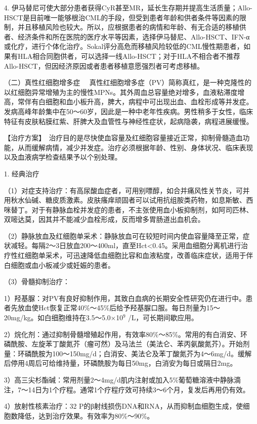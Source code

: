 4.
伊马替尼可使大部分患者获得CyR甚至MR，延长生存期并提高生活质量；Allo-HSCT是目前唯一能够根治CML的手段，但受到患者年龄和供者条件等因素的限制，并且移植风险也较大。所以，应根据患者的病情和年龄、有无合适的移植供者、经济条件和所在医院的医疗水平等因素，选择伊马替尼、Allo-HSCT、IFN-α或化疗，进行个体化治疗。Sokal评分高危而移植风险较低的CML慢性期患者，如果有HLA相合同胞供者，可以选择一线Allo-HSCT；对于HLA不相合者不推荐Allo-HSCT，但因经济原因或者患者移植意愿强烈者可考虑移植。

{（二）真性红细胞增多症}
　真性红细胞增多症（PV）简称真红，是一种克隆性的以红细胞异常增殖为主的慢性MPNs。其外周血总容量绝对增多，血液粘滞度增高，常伴有白细胞和血小板升高，脾大，病程中可出现出血、血栓形成等并发症。发病高峰年龄集中在50～60岁，因此是一种中老年性疾病。男性稍多于女性，临床特征有皮肤粘膜红紫、肝脾大及血管性与神经性症状，起病隐袭，病程进展缓慢。

【治疗方案】　治疗目的是尽快使血容量及红细胞容量接近正常，抑制骨髓造血功能，从而缓解病情，减少并发症。治疗必须根据年龄、性别、身体状况、临床表现以及血液病学检查结果予以个别处理。

1. 经典治疗

（1）对症支持治疗：有高尿酸血症者，可用别嘌醇，如合并痛风性关节炎，可并用秋水仙碱、糖皮质激素。皮肤瘙痒顽固者可以试用抗组胺类药物，如息斯敏、西咪替丁。对于有静脉血栓并发症的患者，不主张使用血小板抑制剂，如阿司匹林、双嘧达莫，因其并不能减少血栓形成，反而增多胃肠道出血机会。

（2）静脉放血及红细胞单采术：静脉放血可在较短时间内使血容量降至正常，症状减轻。每隔2～3日放血200～400ml，直至Hct<0.45。采用血细胞分离机进行治疗性红细胞单采术，可迅速降低血细胞比容和血液粘度，改善临床症状，适用于伴白细胞或血小板减少或妊娠的患者。

（3）骨髓抑制治疗：

1）羟基脲：对PV有良好抑制作用，其致白血病的长期安全性研究仍在进行中。患者先放血使Hct恢复正常40\%～45\%后给予羟基脲口服。每日剂量为15～20mg/kg。如白细胞维持在3.5～5.0×10$^{9}$
/L，可长期间歇应用。

2）烷化剂：通过抑制骨髓增殖起作用，有效率80\%～85\%。常用的有白消安、环磷酰胺、左旋苯丁酸氮芥（瘤可然）及马法兰（美法仑、苯丙氨酸氮芥）。开始剂量：环磷酰胺为100～150mg/d；白消安、美法仑及苯丁酸氮芥为4～6mg/d。缓解后停用4周后可给维持量，环磷酰胺为每日50mg，白消安为每日或隔日2mg。

3）高三尖杉酯碱：常用剂量2～4mg/d肌内注射或加入5\%葡萄糖溶液中静脉滴注，7～14日为1个疗程。通常1个疗程疗效可持续3～6个月，复发后再用仍有效。

4）放射性核素治疗：{32}
P的β射线损伤DNA和RNA，从而抑制血细胞生成，使细胞数降低，达到治疗效果。有效率为80\%～90\%。

